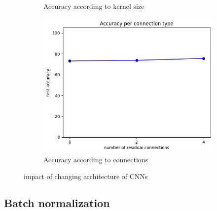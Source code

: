 \begin{figure}[htbp]
\begin{subfigure}[t]{0.3\linewidth}
		\caption{Accuracy according to kernel size}
		\label{fig:q4-2-kernel}
	\end{subfigure}%
    \hfill
	\begin{subfigure}[t]{0.3\linewidth}
		\centering
		\includegraphics[width=\linewidth]{image/q4-2-connection.png}
		\caption{Accuracy according to connections}
		\label{fig:q4-2-connection}
	\end{subfigure}

	\caption{impact of changing architecture of CNNs}
	\label{fig:cnn_architecture}
\end{figure}

\subsection{Batch normalization}

